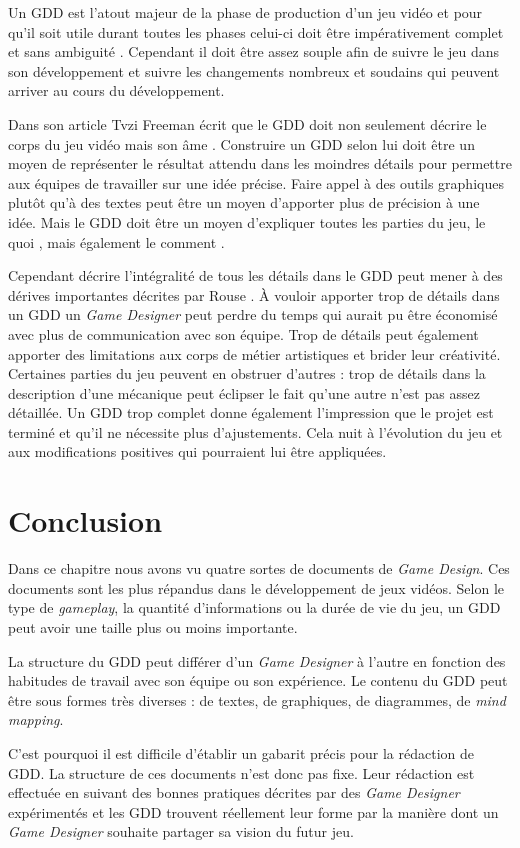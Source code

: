 Un GDD est l'atout majeur de la phase de production d'un jeu vidéo et pour qu'il soit utile durant toutes les phases celui-ci doit être impérativement complet et sans ambiguité \cite{GD_Guidelines}. Cependant il doit être assez souple afin de suivre le jeu dans son développement et suivre les changements nombreux et soudains qui peuvent arriver au cours du développement.

Dans son article  \cite{gama_greateGDD} Tvzi Freeman écrit que le GDD doit non seulement décrire le corps du jeu vidéo mais son \guillemotleft âme \guillemotright. Construire un GDD selon lui doit être un moyen de représenter le résultat attendu dans les moindres détails pour permettre aux équipes de travailler sur une idée précise. Faire appel à des outils graphiques plutôt qu'à des textes peut être un moyen d'apporter plus de précision à une idée. Mais le GDD doit être un moyen d'expliquer toutes les parties du jeu, le \guillemotleft quoi \guillemotright, mais également le \guillemotleft comment \guillemotright.

Cependant décrire l'intégralité de tous les détails dans le GDD peut mener à des dérives importantes décrites par Rouse \cite{GD_theory_rouse}. À vouloir apporter trop de détails dans un GDD un \emph{Game Designer} peut perdre du temps qui aurait pu être économisé avec plus de communication avec son équipe. Trop de détails peut également apporter des limitations aux corps de métier artistiques et brider leur créativité. Certaines parties du jeu peuvent en obstruer d'autres : trop de détails dans la description d'une mécanique peut éclipser le fait qu'une autre n'est pas assez détaillée. Un GDD trop complet donne également l'impression que le projet est terminé et qu'il ne nécessite plus d'ajustements. Cela nuit à l'évolution du jeu et aux modifications positives qui pourraient lui être appliquées.



\section{Conclusion}
Dans ce chapitre nous avons vu quatre sortes de documents de \emph{Game Design}. Ces documents sont les plus répandus dans le développement de jeux vidéos. Selon le type de \emph{gameplay}, la quantité d'informations ou la durée de vie du jeu, un GDD peut avoir une taille plus ou moins importante. 

La structure du GDD peut différer d'un \emph{Game Designer} à l'autre en fonction des habitudes de travail avec son équipe ou son expérience. Le contenu du GDD peut être sous formes très diverses : de textes, de graphiques, de diagrammes, de \emph{mind mapping}. 

C'est pourquoi il est difficile d'établir un gabarit précis pour la rédaction de GDD. La structure de ces documents n'est donc pas fixe. Leur rédaction est effectuée en suivant des bonnes pratiques décrites par des \emph{Game Designer} expérimentés et les GDD trouvent réellement leur forme par la manière dont un \emph{Game Designer} souhaite partager sa vision du futur jeu.
